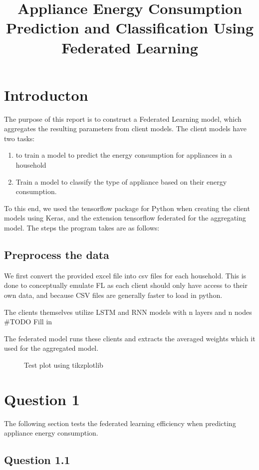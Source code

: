\documentclass[a4paper, article, oneside, USenglish, IN5460]{memoir}
\title{Appliance Energy Consumption Prediction and Classification Using Federated Learning}
\begin{document}
\projectfrontpage


\chapter{Introducton}

The purpose of this report is to construct a Federated Learning model, which aggregates the resulting parameters from client models. The client models have two tasks:
\begin{enumerate}
    \item to train a model to predict the energy consumption for appliances in a household
    \item Train a model to classify the type of appliance based on their energy consumption.    
\end{enumerate}

To this end, we used the tensorflow package for Python when creating the client models using Keras, and the extension tensorflow federated for the aggregating model. The steps the program takes are as follows:
\section{Preprocess the data}
We first convert the provided excel file into csv files for each household. This is done to conceptually emulate FL as each client should only have access to their own data, and because CSV files are generally faster to load in python.

The clients themselves utilize LSTM and RNN models with n layers and n nodes #TODO Fill in

The federated model runs these clients and extracts the averaged weights which it used for the aggregated model.



\begin{figure}[h]
  \centering
    
  \caption{Test plot using tikzplotlib}
\end{figure}



\chapter{Question 1}

The following section tests the federated learning efficiency when predicting appliance energy consumption.

\section{Question 1.1}
\end{document}
